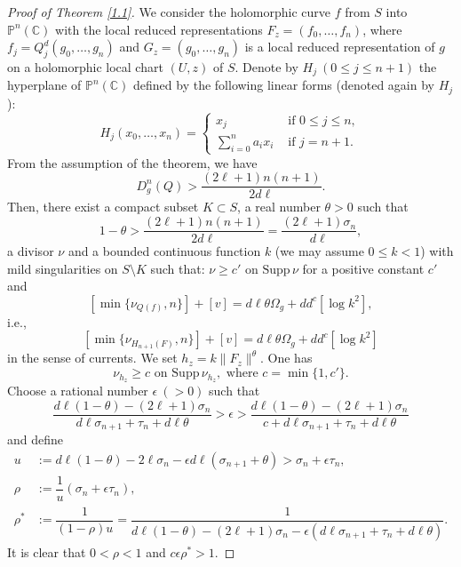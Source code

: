 \documentclass[12pt,article]{amsart}
\newcommand{\C}{{\mathbb{C}}}
\renewcommand{\P}{{\mathbb{P}}}
\newcommand{\supp}{\mathrm{Supp}\,}
\numberwithin{equation}{section}
\begin{document}
\begin{proof}[Proof of Theorem \ref{1.1}]
We consider the holomorphic curve $f$ from $S$ into $\P^n(\C)$ with the local reduced representations $F_z=(f_0,\ldots,f_n)$, where $f_j=Q_j^d(g_0,\ldots,g_n)$ and $G_z=(g_0,\ldots,g_n)$ is a local reduced representation of $g$ on a holomorphic local chart $(U,z)$ of $S$.   Denote by $H_j\ (0\le j\le n+1)$ the hyperplane of $\P^n(\C)$ defined by the following linear forms (denoted again by $H_j$):
$$H_j(x_0,\ldots,x_n)=
\begin{cases}
x_j&\text{ if }0\le j\le n,\\
\sum_{i=0}^na_ix_i&\text{ if }j=n+1.
\end{cases}
 $$
From the assumption of the theorem, we have
$$D^{n}_{g}(Q)>\dfrac{(2\ell+1)n(n+1)}{2d\ell}.$$
Then, there exist a compact subset $K\subset S$, a real number $\theta>0$ such that
$$1-\theta>\dfrac{(2\ell+1)n(n+1)}{2d\ell}=\frac{(2\ell+1)\sigma_n}{d\ell},$$
a divisor $\nu$ and a bounded continuous function $k$ (we may assume $0\le k<1$) with mild singularities on $S\setminus K$ such that: $\nu\ge c'$ on $\supp\nu$ for a positive constant $c'$ and
$$ [\min\{\nu_{Q(f)},n\}]+[v]=d\ell\theta\Omega_g +dd^c[\log k^2],$$
i.e.,
$$ [\min\{\nu_{H_{n+1}(F)},n\}]+[v]=d\ell\theta\Omega_g +dd^c[\log k^2]$$
in the sense of currents. We set $h_z=k\|F_z\|^{\theta}$. One has
$$ \nu_{h_{z}}\ge c\text{ on }\supp\nu_{h_{z}}, \text{ where }c=\min\{1,c'\}. $$
Choose a rational number $\epsilon\ (>0)$ such that
$$\dfrac{d\ell(1-\theta)-(2\ell+1)\sigma_n}{d\ell\sigma_{n+1}+\tau_n+d\ell\theta}>\epsilon>\dfrac{d\ell(1-\theta)-(2\ell+1)\sigma_n}{c+d\ell\sigma_{n+1}+\tau_n+d\ell\theta}$$
and define
\begin{align*}
u&:=d\ell(1-\theta)-2\ell\sigma_n-\epsilon d\ell\left (\sigma_{n+1}+\theta\right)>\sigma_n+\epsilon\tau_n,\\ 
\rho&:=\dfrac{1}{u}(\sigma_n+\epsilon\tau_n),\\
\rho^*&:=\dfrac{1}{(1-\rho)u}=\dfrac{1}{d\ell(1-\theta)-(2\ell+1)\sigma_n-\epsilon(d\ell\sigma_{n+1}+\tau_n+d\ell\theta)}. 
\end{align*}
It is clear that $0<\rho<1$ and $c\epsilon\rho^*>1.$


\end{proof}
\end{document}
